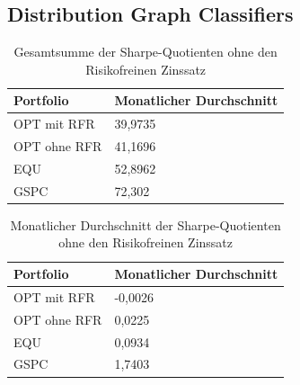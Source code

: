 \documentclass[12pt]{article}
\begin{document}
        \subsection{Distribution Graph Classifiers}

       

  
                
        \begin{table}[htp]
            \begin{center}
                
                \begin{tabular}{ | l | l | }

                    \hline
                    \textbf{Portfolio}   & \textbf{Monatlicher Durchschnitt} \\
                    \hline
                    OPT mit RFR          & 39,9735  \\          
                    OPT ohne RFR         & 41,1696 \\
                    EQU                  & 52,8962  \\              
                    GSPC                 & 72,302  \\       
                            
                    \hline

                \end{tabular}
                \caption{Gesamtsumme der Sharpe-Quotienten ohne den Risikofreinen Zinssatz}
                \label{gs-sq-ohne-rfz}

            \end{center}
        \end{table}

        \begin{table}[htp]
            \begin{center}
                
                \begin{tabular}{ | l | l | }

                    \hline
                    \textbf{Portfolio}   & \textbf{Monatlicher Durchschnitt} \\
                    \hline
                    OPT mit RFR          & -0,0026 \\      
                    OPT ohne RFR         & 0,0225 \\
                    EQU                  & 0,0934 \\            
                    GSPC                 & 1,7403 \\     
                            
                    \hline

                \end{tabular}
                \caption{Monatlicher Durchschnitt der Sharpe-Quotienten ohne den Risikofreinen Zinssatz}
                \label{md-sq-ohne-rfz}

            \end{center}
        \end{table}
\end{document}
